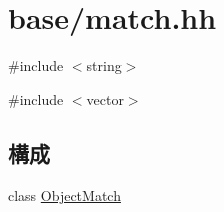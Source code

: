 \hypertarget{match_8hh}{
\section{base/match.hh}
\label{match_8hh}
}
{\ttfamily \#include $<$string$>$}\par
{\ttfamily \#include $<$vector$>$}\par
\subsection*{構成}
\begin{DoxyCompactItemize}
\item 
class \hyperlink{classObjectMatch}{ObjectMatch}
\end{DoxyCompactItemize}
